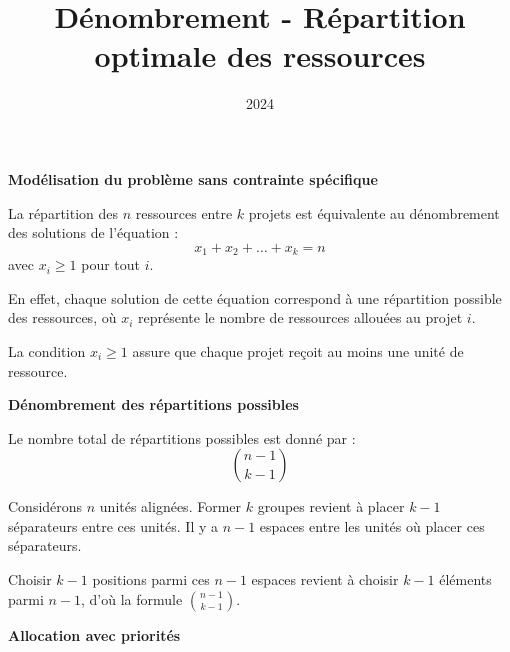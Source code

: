\documentclass[10pt,a4paper]{article}
\title{Dénombrement - Répartition optimale des ressources}
\author{}
\date{2024}
\begin{document}
\q \textbf{Modélisation du problème sans contrainte spécifique}

La répartition des $ n $ ressources entre $ k $ projets est équivalente au dénombrement des
solutions de l'équation :
$$
x_1 + x_2 + \dots + x_k = n
$$
avec $ x_i \geq 1 $ pour tout $ i $.

En effet, chaque solution de cette équation correspond à une répartition possible des ressources, où
$ x_i $ représente le nombre de ressources allouées au projet $ i $.

La condition $ x_i \geq 1$ assure que chaque projet reçoit au moins une unité de ressource.

\q \textbf{Dénombrement des répartitions possibles}

Le nombre total de répartitions possibles est donné par :
$$
\binom{n-1}{k-1}
$$

Considérons $ n $ unités alignées. Former $ k $ groupes revient à placer $ k-1 $ séparateurs
entre ces unités. Il y a $ n-1 $ espaces entre les unités où placer ces séparateurs.

Choisir $ k-1 $ positions parmi ces $ n-1 $ espaces revient à choisir $ k-1$ éléments parmi
$n-1 $, d'où la formule $ \binom{n-1}{k-1} $.

\q \textbf{Allocation avec priorités}
\end{document}
